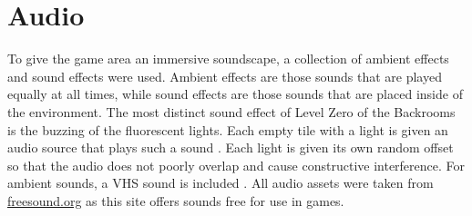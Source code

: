 \section{Audio}
To give the game area an immersive soundscape, a collection of ambient effects and sound effects were used. Ambient effects are those sounds that are played equally at all times, while sound effects are those sounds that are placed inside of the environment. The most distinct sound effect of Level Zero of the Backrooms is the buzzing of the fluorescent lights. Each empty tile with a light is given an audio source that plays such a sound \cite{fluorescent_sound}. Each light is given its own random offset so that the audio does not poorly overlap and cause constructive interference. For ambient sounds, a VHS sound is included \cite{vhs_sound}. All audio assets were taken from \url{freesound.org} as this site offers sounds free for use in games.